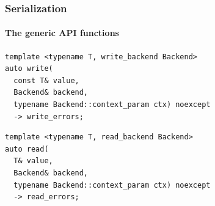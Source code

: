 \documentclass[compress,table,xcolor=table]{beamer}
\begin{document}
\begin{frame}[fragile]
\begin{columns}
  \end{columns}
\end{frame}
\begin{frame}[fragile]
  \frametitle{Serialization}
  \framesubtitle{The generic API functions}
  \begin{lstlisting}[language=c++2x,basicstyle=\small\ttfamily]
template <typename T, write_backend Backend>
auto write(
  const T& value,
  Backend& backend,
  typename Backend::context_param ctx) noexcept
  -> write_errors;
  \end{lstlisting}
  \vfill
  \begin{lstlisting}[language=c++2x,basicstyle=\small\ttfamily]
template <typename T, read_backend Backend>
auto read(
  T& value,
  Backend& backend,
  typename Backend::context_param ctx) noexcept
  -> read_errors;
  \end{lstlisting}
\end{frame}
\end{document}
